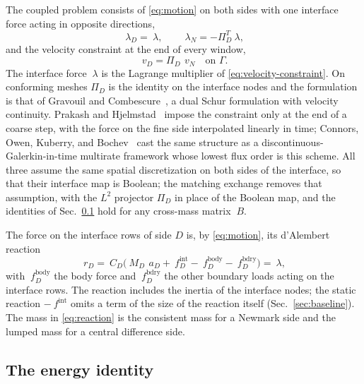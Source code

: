 \documentclass[11pt]{article}
\begin{document}
The coupled problem consists of \eqref{eq:motion} on both sides with one
interface force acting in opposite directions,
\begin{equation}
  ~\lambda_D = ~\lambda, \qquad ~\lambda_N = -\Pi_D^T ~\lambda ,
  \label{eq:action-reaction}
\end{equation}
and the velocity constraint at the end of every window,
\begin{equation}
  ~v_D = \Pi_D\, ~v_N \quad \text{on } \Gamma .
  \label{eq:velocity-constraint}
\end{equation}
The interface force $~\lambda$ is the Lagrange multiplier of
\eqref{eq:velocity-constraint}. On conforming meshes $\Pi_D$ is the identity
on the interface nodes and the formulation is that of Gravouil and
Combescure~\cite{GravouilCombescure2001}, a dual Schur formulation with
velocity continuity. Prakash and Hjelmstad~\cite{PrakashHjelmstad2004}
impose the constraint only at the end of a coarse step, with the force on
the fine side interpolated linearly in time; Connors, Owen, Kuberry, and
Bochev~\cite{ConnorsEtAl2024} cast the same structure as a
discontinuous-Galerkin-in-time multirate framework whose lowest flux order
is this scheme. All three assume the same spatial discretization on both
sides of the interface, so that their interface map is Boolean; the
matching exchange removes that assumption, with the $L^2$ projector
$\Pi_D$ in place of the Boolean map, and the identities of
Sec.~\ref{sec:identity} hold for any cross-mass matrix $~B$.

The force on the interface rows of side $D$ is, by \eqref{eq:motion}, its
d'Alembert reaction
\begin{equation}
  ~r_D = ~C_D \bigl( ~M_D\, ~a_D + ~f^{\mathrm{int}}_D - ~f^{\mathrm{body}}_D
        - ~f^{\mathrm{bdry}}_D \bigr) = ~\lambda ,
  \label{eq:reaction}
\end{equation}
with $~f^{\mathrm{body}}_D$ the body force and $~f^{\mathrm{bdry}}_D$ the
other boundary loads acting on the interface rows. The reaction includes
the inertia of the interface nodes; the static reaction
$-~f^{\mathrm{int}}$ omits a term of the size of the reaction itself
(Sec.~\ref{sec:baseline}). The mass in \eqref{eq:reaction} is the
consistent mass for a Newmark side and the lumped mass for a central
difference side.

\subsection{The energy identity}
\label{sec:identity}
\end{document}
